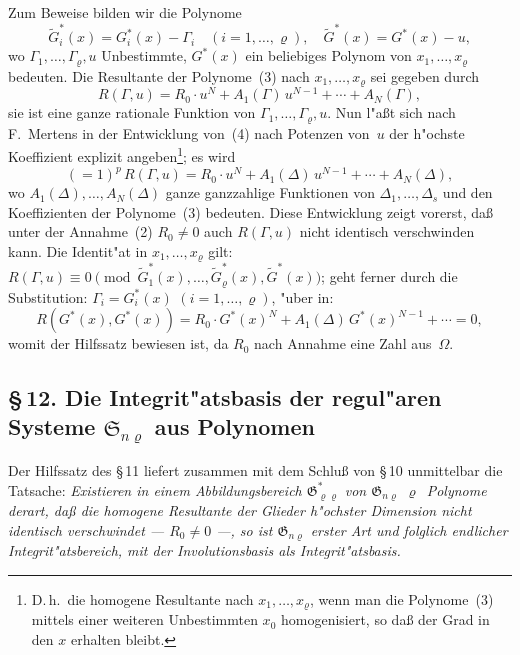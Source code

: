 \documentclass[11pt,a4paper]{article}
\begin{document}
Zum Beweise bilden wir die Polynome
\begin{equation}
\tilde{G}_{i}^{*}(x)=G_{i}^{*}(x)-\Gamma_{i}\quad(i=1,\dots,\varrho),\quad
\tilde{G}^{*}(x)=G^{*}(x)-u,
\tag{3}
\end{equation}
wo $\Gamma_{1},\dots,\Gamma_{\varrho},u$ Unbestimmte, $G^{*}(x)$ ein beliebiges Polynom von
$x_{1},\dots,x_{\varrho}$ bedeuten. Die Resultante der Polynome~(3) nach $x_{1},\dots,x_{\varrho}$
sei gegeben durch
\begin{equation}
R(\Gamma,u)=R_{0}\cdot u^{N}+A_{1}(\Gamma)\,u^{N-1}+\cdots+A_{N}(\Gamma),
\tag{4}
\end{equation}
sie ist eine ganze rationale Funktion von $\Gamma_{1},\dots,\Gamma_{\varrho},u$. Nun l"{a}\ss{}t sich
nach F.~Mertens in der Entwicklung von~(4) nach Potenzen von~$u$ der
h"{o}chste Koeffizient explizit angeben\footnote{D.\,h.\ die homogene Resultante
nach $x_{1},\dots,x_{\varrho}$, wenn man die Polynome~(3) mittels einer weiteren Unbestimmten
$x_{0}$ homogenisiert, so da\ss{} der Grad in den $x$ erhalten bleibt.}; es wird
\begin{equation}
(=1)^{p}\,R(\Gamma,u)=R_{0}\cdot u^{N}+A_{1}(\Delta)\,u^{N-1}+\cdots+A_{N}(\Delta),
\tag{5}
\end{equation}
wo $A_{1}(\Delta),\dots,A_{N}(\Delta)$ ganze ganzzahlige Funktionen von $\Delta_{1},\dots,\Delta_{s}$
und den Koeffizienten der Polynome~(3) bedeuten. Diese Entwicklung
zeigt vorerst, da\ss{} unter der Annahme~(2) $R_{0}\neq 0$ auch $R(\Gamma,u)$ nicht
identisch verschwinden kann. Die Identit"{a}t in $x_{1},\dots,x_{\varrho}$ gilt:
$R(\Gamma,u)\equiv 0\pmod{\tilde{G}_{1}^{*}(x),\dots,\tilde{G}_{\varrho}^{*}(x),\tilde{G}^{*}(x)}$;
geht ferner durch die Substitution:
$\Gamma_{i}=G_{i}^{*}(x)$ $(i=1,\dots,\varrho)$,
"{u}ber in:
\begin{equation}
R(G^{*}(x),G^{*}(x))=R_{0}\cdot G^{*}(x)^{N}+A_{1}(\Delta)\,G^{*}(x)^{N-1}+\cdots=0,
\tag{6}
\end{equation}
womit der Hilfssatz bewiesen ist, da $R_{0}$ nach Annahme eine Zahl aus~$\Omega$.

\subsection*{\S\,12. Die Integrit"{a}tsbasis der regul"{a}ren Systeme $\mathfrak{S}_{n\varrho}$ aus Polynomen}

Der Hilfssatz des \S\,11 liefert zusammen mit dem Schlu\ss{} von \S\,10
unmittelbar die Tatsache: \emph{Existieren in einem Abbildungsbereich
$\mathfrak{G}_{\varrho\varrho}^{*}$ von $\mathfrak{G}_{n\varrho}$ $\varrho$~Polynome derart, da\ss{} die homogene Resultante der
Glieder h"{o}chster Dimension nicht identisch verschwindet --- $R_{0}\neq 0$ ---,
so ist $\mathfrak{G}_{n\varrho}$ erster Art und folglich endlicher Integrit"{a}tsbereich, mit der
Involutionsbasis als Integrit"{a}tsbasis.}
\end{document}
